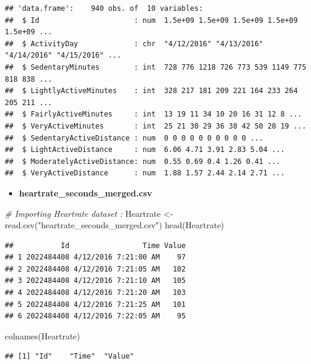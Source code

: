 \documentclass[
]{article}
\newenvironment{Shaded}{\begin{snugshade}}{\end{snugshade}}
\newcommand{\CommentTok}[1]{\textcolor[rgb]{0.56,0.35,0.01}{\textit{#1}}}
\newcommand{\FunctionTok}[1]{\textcolor[rgb]{0.00,0.00,0.00}{#1}}
\newcommand{\NormalTok}[1]{#1}
\newcommand{\OtherTok}[1]{\textcolor[rgb]{0.56,0.35,0.01}{#1}}
\newcommand{\StringTok}[1]{\textcolor[rgb]{0.31,0.60,0.02}{#1}}
\providecommand{\tightlist}{%
  \setlength{\itemsep}{0pt}\setlength{\parskip}{0pt}}
\begin{document}
\begin{verbatim}
## 'data.frame':    940 obs. of  10 variables:
##  $ Id                      : num  1.5e+09 1.5e+09 1.5e+09 1.5e+09 1.5e+09 ...
##  $ ActivityDay             : chr  "4/12/2016" "4/13/2016" "4/14/2016" "4/15/2016" ...
##  $ SedentaryMinutes        : int  728 776 1218 726 773 539 1149 775 818 838 ...
##  $ LightlyActiveMinutes    : int  328 217 181 209 221 164 233 264 205 211 ...
##  $ FairlyActiveMinutes     : int  13 19 11 34 10 20 16 31 12 8 ...
##  $ VeryActiveMinutes       : int  25 21 30 29 36 38 42 50 28 19 ...
##  $ SedentaryActiveDistance : num  0 0 0 0 0 0 0 0 0 0 ...
##  $ LightActiveDistance     : num  6.06 4.71 3.91 2.83 5.04 ...
##  $ ModeratelyActiveDistance: num  0.55 0.69 0.4 1.26 0.41 ...
##  $ VeryActiveDistance      : num  1.88 1.57 2.44 2.14 2.71 ...
\end{verbatim}

\begin{itemize}
\tightlist
\item
  \textbf{heartrate\_seconds\_merged.csv}
\end{itemize}

\begin{Shaded}
\begin{Highlighting}[]
\CommentTok{\# Importing Heartrate dataset :}
\NormalTok{Heartrate }\OtherTok{\textless{}{-}} \FunctionTok{read.csv}\NormalTok{(}\StringTok{"heartrate\_seconds\_merged.csv"}\NormalTok{)}
\FunctionTok{head}\NormalTok{(Heartrate)}
\end{Highlighting}
\end{Shaded}

\begin{verbatim}
##           Id                 Time Value
## 1 2022484408 4/12/2016 7:21:00 AM    97
## 2 2022484408 4/12/2016 7:21:05 AM   102
## 3 2022484408 4/12/2016 7:21:10 AM   105
## 4 2022484408 4/12/2016 7:21:20 AM   103
## 5 2022484408 4/12/2016 7:21:25 AM   101
## 6 2022484408 4/12/2016 7:22:05 AM    95
\end{verbatim}

\begin{Shaded}
\begin{Highlighting}[]
\FunctionTok{colnames}\NormalTok{(Heartrate)}
\end{Highlighting}
\end{Shaded}

\begin{verbatim}
## [1] "Id"    "Time"  "Value"
\end{verbatim}
\end{document}
